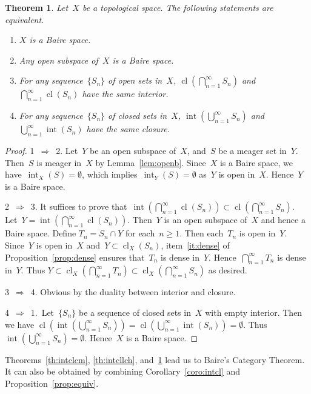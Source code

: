 \documentclass[11pt,a4paper]{article}  %
\newtheorem{theorem}{Theorem}[section]
\theoremstyle{definition}
\DeclareMathOperator{\inter}{int}
\DeclareMathOperator{\cl}{cl}
\numberwithin{equation}{section}
\begin{document}
\begin{theorem}
  \label{th:intcl}
   Let~$X$ be a topological space. The following statements are equivalent.
   \begin{enumerate}
     \item $X$ is a Baire space.
     \item Any open subspace of~$X$ is a Baire space.
     \item For any sequence~$\{S_n\}$ of open sets in~$X$, $\cl(\bigcap_{n=1}^\infty S_n)$ and
       $\bigcap_{n=1}^\infty \cl(S_n)$ have the same interior.
     \item For any sequence~$\{S_n\}$ of closed sets in~$X$, $\inter(\bigcup_{n=1}^\infty S_n)$ and
       $\bigcup_{n=1}^\infty \inter(S_n)$ have the same closure.
   \end{enumerate}
\end{theorem}

\begin{proof}
  1~$\Rightarrow$~2. Let~$Y$ be an open subspace of~$X$, and~$S$ be a meager set in~$Y$.
  Then~$S$ is meager in~$X$ by Lemma~\ref{lem:openb}. Since~$X$ is a Baire space, we
  have~$\inter_X(S)=\emptyset$, which implies~$\inter_Y(S)=\emptyset$ as~$Y$ is open in~$X$.
  Hence~$Y$ is a Baire space.

  2~$\Rightarrow$~3. It suffices to prove that~$\inter(\bigcap_{n=1}^\infty \cl(S_n))\subset\cl(\bigcap_{n=1}^\infty S_n)$.
  Let~$Y=\inter(\bigcap_{n=1}^\infty \cl(S_n))$. Then~$Y$ is an open subspace of~$X$ and hence a Baire space.
  Define $T_n = S_n\cap Y$ for each~$n\ge 1$. Then each~$T_n$ is open in~$Y$. Since~$Y$ is open
  in~$X$ and~$Y\subset \cl_X(S_n)$, item~\ref{it:dense} of Proposition~\ref{prop:dense} ensures
  that~$T_n$ is dense in~$Y$. Hence~$\bigcap_{n=1}^\infty T_n$
  is dense in~$Y$. Thus $Y \subset \cl_X(\bigcap_{n=1}^\infty T_n) \subset
  \cl_X(\bigcap_{n=1}^\infty S_n)$ as desired.

  3~$\Rightarrow$~4. Obvious by the duality between interior and closure.

  4~$\Rightarrow$~1.~Let~$\{S_n\}$ be a sequence of closed sets in~$X$ with empty interior. Then we
    have
  $\cl(\inter(\bigcup_{n=1}^\infty S_n)) = \cl(\bigcup_{n=1}^\infty \inter(S_n)) = \emptyset$.
  Thus~$\inter(\bigcup_{n=1}^\infty S_n) = \emptyset$. Hence~$X$ is a Baire space.
\end{proof}

Theorems~\ref{th:intclcm}, \ref{th:intcllch}, and~\ref{th:intcl} lead us to Baire's Category
Theorem. It can also be obtained by combining Corollary~\ref{coro:intcl} and Proposition~\ref{prop:equiv}.
\end{document}
